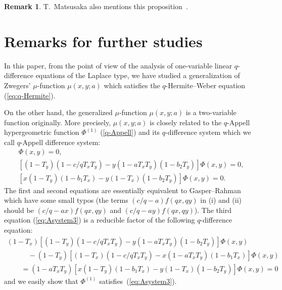\documentclass[pdftex]{sigma}
\numberwithin{equation}{section}
\theoremstyle{definition}
\newtheorem{rmk}[thm]{Remark}
\begin{document}
\begin{rmk}T.~Matsusaka also mentions this proposition~\cite{M}.
\end{rmk}

\section{Remarks for further studies}\label{section5}

In this paper, from the point of view of the analysis of one-variable linear $q$-difference equations of the Laplace type, we have studied a generalization of Zwegers' $\mu$-function $\mu(x,y;a)$ which satisfies the $q$-Hermite--Weber equation (\ref{eq:q-Hermite}).

On the other hand, the generalized $\mu$-function $\mu(x,y;a)$ is a two-variable function originally.
More precisely, $\mu(x,y;a)$ is closely related to the $q$-Appell hypergeometric function $\Phi^{(1)}$ (\ref{q-Appell}) and its $q$-difference system which we call $q$-Appell difference system:
\begin{gather}
[(1-T_{x})(1-c/q T_{x}T_{y})-x(1-aT_{x}T_{y})(1-b_{1}T_{x})]\Phi (x,y)=0,\nonumber \\
[(1-T_{y})(1-c/q T_{x}T_{y})-y(1-aT_{x}T_{y})(1-b_{2}T_{y})]\Phi (x,y)=0, \nonumber\\
\label{eq:Asystem3}
[x(1-T_{y})(1-b_{1}T_{x})-y(1-T_{x})(1-b_{2}T_{y})]\Phi (x,y)=0.
\end{gather}
The first and second equations are essentially equivalent to Gasper--Rahman \cite[Exer\-ci\-ses~10.12(i) and~(ii)]{GR} which have some small typos (the terms $(c/q-a)f(qx,qy)$ in (i) and (ii) should be $(c/q-ax)f(qx,qy)$ and $(c/q-ay)f(qx,qy)$).
The third equation (\ref{eq:Asystem3}) is a reducible factor of the following $q$-difference equation:
\begin{gather*}
 (1-T_{x})[(1-T_{y})(1-c/q T_{x}T_{y})-y(1-aT_{x}T_{y})(1-b_{2}T_{y})]\Phi (x,y) \nonumber \\
\qquad \quad {}-
 (1-T_{y})[(1-T_{x})(1-c/q T_{x}T_{y})-x(1-aT_{x}T_{y})(1-b_{1}T_{x})]\Phi (x,y) \nonumber \\
\qquad{} =
 (1-aT_{x}T_{y})[x(1-T_{y})(1-b_{1}T_{x})-y(1-T_{x})(1-b_{2}T_{y})]\Phi (x,y)
 =0
\end{gather*}
and we easily show that $\Phi^{(1)}$ satisfies~(\ref{eq:Asystem3}).
\end{document}
